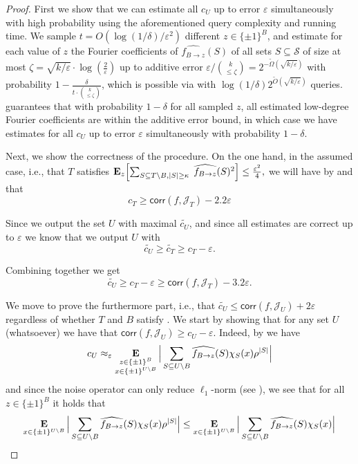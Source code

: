 \documentclass[10pt,a4paper]{article}
\theoremstyle{plain}
\theoremstyle{remark}
\theoremstyle{plain}
\providecommand{\E}{}
\renewcommand{\E}{\mathop{\bf E\/}}
\newcommand{\bigbracket}[1]{\Bigl [ #1 \Bigr ]}
\newcommand{\eps}{\varepsilon}
\renewcommand{\hat}{\widehat}
\renewcommand{\tilde}{\widetilde}
\newcommand{\pmone}{\{\pm 1\}}
\newcommand{\calJ}{\mathcal{J}}
\newcommand{\calS}{\mathcal{S}}
\newcommand{\InfluentialCoords}{\calS}
\newcommand{\corr}{\mathsf{corr}}
\newcommand{\fourierCutoff}{\kappa}
\renewcommand{\epsilon}{\varepsilon}
\begin{document}
\begin{proof}
First we show that we can estimate all ${c_U}$ up to error $\eps$ simultaneously with high probability using the aforementioned query complexity and running time.
We sample $t = O(\log(1/\delta)/\eps^2)$ different $z\in \pmone^B$, and estimate for each value of $z$ the Fourier coefficients of $\hat{f_{B \to z}}(S)$ of all sets $S \subseteq \InfluentialCoords$ of size at most $\zeta = \sqrt{k/\eps} \cdot \log(\tfrac{2}{\eps})$ up to additive error $\eps/\binom{k}{\le \zeta} = 2^{-\tilde{\Omega}(\sqrt{k/\eps})}$ with probability $1- \frac{\delta}{t\cdot \binom{k}{\leq \zeta}}$, which is possible via  with $\log(1/\delta)2^{\tilde{O}(\sqrt{k/\eps})}$ queries. 
 guarantees that with probability $1-\delta$ for all sampled $z$, all estimated low-degree Fourier coefficients are within the additive error bound, in which case we have estimates for all $c_U$ up to error $\eps$ simultaneously with probability $1-\delta$.

Next, we show the correctness of the procedure.
On the one hand, in the assumed case, i.e., that $T$ satisfies $\E_z\bigbracket{\sum_{\substack{S \subseteq T \setminus B,  |S| \geq \fourierCutoff}} \;\hat{f_{B \to z}}(S)^2} \leq \frac{\epsilon^2}{4},$
we will have by   and  that \begin{equation}\label{eq:ct:lb}c_T \ge  \corr(f, \calJ_T) - 2.2 \eps\end{equation}


     
    Since we output the set $U$ with maximal $\tilde{c_U}$, and since all estimates are correct up to $\eps$ 
    we know that we output $U$ with \begin{equation}\label{eq:cu:ct}\tilde{c_U} \ge \tilde{c_T} \ge c_T-\eps.\end{equation}
     
  Combining  together we get $$\tilde{c_U}  \ge c_T - \eps \ge  \corr(f, \calJ_T) - 3.2\eps.$$
  
  We move to prove the furthermore part, i.e., that $\tilde{c_U} \le \corr(f,\calJ_U) + 2\eps$ regardless of whether $T$ and $B$ satisfy .
  We start by showing that for any set $U$ (whatsoever) we have that $\corr(f,\calJ_U) \ge c_U - \eps$.
Indeed, by  we have $${c_U} \approx_{\eps}\E_{\substack{z \in \pmone^{B}\\x \in \pmone^{U \setminus B}}}
     \Big | \sum_{S \subseteq U\setminus B} \hat{f_{B \to z}}(S)\chi_S(x)\rho^{|S|}\Big|$$ and since the noise operator can only reduce $\ell_1$-norm (see ), we see that for all $z\in \pmone^{B}$ it holds that
     $$
     \E_{x \in \pmone^{U \setminus B}}
     \Big | \sum_{S \subseteq U\setminus B} \hat{f_{B \to z}}(S)\chi_S(x)\rho^{|S|}\Big| \le 
     \E_{x \in \pmone^{U \setminus B}}
     \Big | \sum_{S \subseteq U\setminus B} \hat{f_{B \to z}}(S)\chi_S(x)\Big|
     $$
     

\end{proof}
\end{document}
